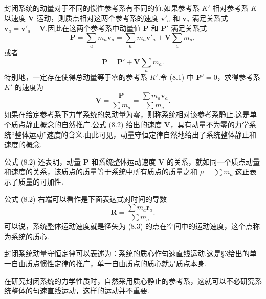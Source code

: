 封闭系统的动量对于不同的惯性参考系有不同的值.如果参考系 $K'$ 相对参考系 $K$ 以速度 $\boldsymbol{V}$ 运动，则质点相对这两个参考系的速度 $\boldsymbol{v}'_a$ 和 $\boldsymbol{v}_a$ 满足关系式 $\boldsymbol{v}_a=\boldsymbol{v}'_a+\boldsymbol{V}$.因此在这两个参考系中动量值 $\boldsymbol{P}$ 和 $\boldsymbol{P}'$ 满足关系式
\begin{equation*}
  \boldsymbol{P}=\sum_a m_a\boldsymbol{v}_a
  =\sum_a m_a\boldsymbol{v}'_a+\boldsymbol{V}\sum_a m_a,
\end{equation*}
或者
\begin{equation}
  \boldsymbol{P}=\boldsymbol{P}'+\boldsymbol{V}\sum_a m_a.
\end{equation}
特别地，一定存在使得总动量等于零的参考系 $K'$.令 (8.1) 中 $\boldsymbol{P}'=0$，求得参考系 $K'$ 的速度为
\begin{equation}
  \boldsymbol{V}=\frac{\boldsymbol{P}}{\sum m_a}
  =\frac{\sum m_a\boldsymbol{v}_a}{\sum m_a}.
\end{equation}
如果在给定参考系下力学系统的总动量为零，则称系统相对该参考系静止.这是单个质点静止概念的自然推广.公式 (8.2) 给出的速度 $\boldsymbol{V}$，具有动量不为零的力学系统“整体运动”速度的含义.由此可见，动量守恒定律自然地给出了系统整体静止和速度的概念.

公式 (8.2) 还表明，动量 $\boldsymbol{P}$ 和系统整体运动速度 $\boldsymbol{V}$ 的关系，就如同一个质点动量和速度的关系，该质点的质量等于系统中所有质点的质量之和 $\mu=\sum m_a$.这正表示了质量的可加性.

公式 (8.2) 右端可以看作是下面表达式对时间的导数
\begin{equation}
  \boldsymbol{R}=\frac{\sum m_a\boldsymbol{r}_a}{\sum m_a}.
\end{equation}
可以说，系统整体运动速度就是径矢为 (8.3) 的点在空间中的运动速度，这个点称为系统的质心.

封闭系统动量守恒定律可以表述为：系统的质心作匀速直线运动.这是§3给出的单一自由质点惯性定律的推广，单一自由质点的质心就是质点本身.

在研究封闭系统的力学性质时，自然采用质心静止的参考系，这就可以不必研究系统整体的匀速直线运动，这样的运动并不重要.

